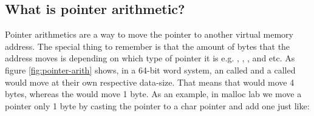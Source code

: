 \subsection{What is pointer arithmetic?}
Pointer arithmetics are a way to move the pointer to another virtual memory address. The special thing to remember is that the amount of bytes that the address moves is depending on which type of pointer it is e.g. , , , and etc.
As figure \ref{fig:pointer-arith} shows, in a 64-bit word system, an  called  and a  called  would move at their own respective data-size. That means that  would move 4 bytes, whereas the  would move 1 byte.
As an example, in malloc lab we move a pointer only 1 byte by casting the pointer to a char pointer and add one just like: 
\begin{figure}[h]
    \centering
\end{figure}